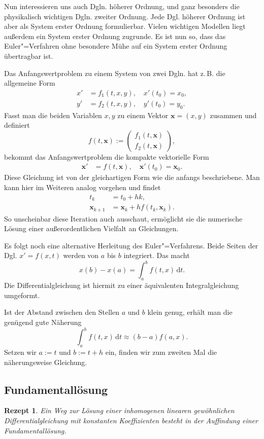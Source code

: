 \documentclass[a4paper,10pt,fleqn,twocolumn,twoside,dvipdfmx]{scrartcl}
\theoremstyle{rmbox}
\newtheorem{Rezept}{Rezept}[section]
\newcommand{\bv}[1]{\mathbf{#1}}
\begin{document}
Nun interessieren uns auch Dgln. höherer Ordnung, und ganz besonders
die physikalisch wichtigen Dgln. zweiter Ordnung. Jede Dgl. höherer
Ordnung ist aber als System erster Ordnung formulierbar. Vielen
wichtigen Modellen liegt außerdem ein System erster Ordnung zugrunde.
Es ist nun so, dass das Euler"=Verfahren ohne besondere Mühe
auf ein System erster Ordnung übertragbar ist.

Das Anfangswertproblem zu einem System von zwei Dgln. hat
z.\,B. die allgemeine Form%
\[\begin{split}
x' &= f_1(t,x,y),\quad x'(t_0)=x_0,\\
y' &= f_2(t,x,y),\quad y'(t_0)=y_0.
\end{split}\]
Fasst man die beiden Variablen $x,y$ zu einem Vektor
$\bv x = (x,y)$ zusammen und definiert%
\[
f(t,\bv x) := \begin{pmatrix}
f_1(t,\bv x)\\
f_2(t,\bv x)
\end{pmatrix},
\]
bekommt das Anfangswertproblem die kompakte
vektorielle Form
\[\begin{split}
\bv x' &= f(t,\bv x),\quad \bv x'(t_0)=\bv x_0.
\end{split}\]
Diese Gleichung ist von der gleichartigen Form wie die anfangs
beschriebene. Man kann hier im Weiteren analog vorgehen und findet%
\begin{align*}
t_{k} &= t_0+hk,\\
\bv x_{k+1} &= \bv x_k+hf(t_k,\bv x_k).
\end{align*}
So unscheinbar diese Iteration auch ausschaut, ermöglicht sie die
numerische Lösung einer außerordentlichen Vielfalt an Gleichungen.

Es folgt noch eine alternative Herleitung des Euler"=Verfahrens. Beide
Seiten der Dgl. $x'=f(x,t)$ werden
von $a$ bis $b$ integriert. Das macht%
\[x(b)-x(a) = \int_a^b f(t,x)\,\mathrm dt.\]
Die Differentialgleichung ist hiermit zu einer äquivalenten
Integralgleichung umgeformt.

Ist der Abstand zwischen den Stellen
$a$ und $b$ klein genug, erhält
man die genügend gute Näherung%
\[\int_a^b f(t,x)\,\mathrm dt \approx (b-a)f(a,x).\]
Setzen wir $a:=t$ und $b:=t+h$ ein, finden wir
zum zweiten Mal die näherungsweise Gleichung.


\subsection{Fundamentallösung}

\begin{Rezept}
Ein Weg zur Lösung einer inhomogenen linearen gewöhnlichen
Differentialgleichung mit konstanten Koeffizienten
besteht in der Auffindung einer Fundamentallösung.
\end{Rezept}
\end{document}
